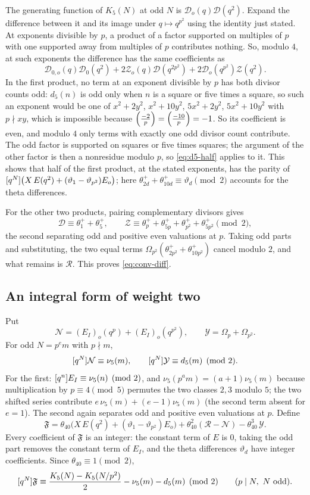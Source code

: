 The generating function of $K_5(N)$ at odd $N$ is $\mathcal D_o(q)\mathcal D(q^2)$.
Expand the difference between it and its image under $q\mapsto q^{p^2}$ using the
identity just stated. At exponents divisible by $p$, a product of a factor
supported on multiples of $p$ with one supported away from multiples of $p$
contributes nothing. So, modulo $4$, at such exponents the difference has the
same coefficients as
\[
  \mathcal D_{0,o}(q)\mathcal D_0(q^2)+2\mathcal Z_o(q)\mathcal D(q^{2p^2})+2\mathcal D_o(q^{p^2})\mathcal Z(q^2).
\]
In the first product, no term at an exponent divisible by $p$ has both divisor
counts odd: $d_5(n)$ is odd only when $n$ is a square or five times a square, so
such an exponent would be one of $x^2+2y^2$, $x^2+10y^2$, $5x^2+2y^2$,
$5x^2+10y^2$ with $p\nmid xy$, which is impossible because
$\Bigl(\frac{-2}{p}\Bigr)=\Bigl(\frac{-10}{p}\Bigr)=-1$. So its coefficient is even, and modulo $4$ only terms
with exactly one odd divisor count contribute. The odd factor is supported on
squares or five times squares; the argument of the other factor is then a
nonresidue modulo $p$, so \eqref{eq:d5-half} applies to it. This shows that half
of the first product, at the stated exponents, has the parity of
$[q^{N}]\bigl(X\,E(q^2)+(\vartheta_1-\vartheta_{p^2})E_o\bigr)$; here
$\theta^+_{2d}+\theta^+_{10d}\equiv\vartheta_d\pmod2$ accounts for the theta differences.

For the other two products, pairing complementary divisors gives
\[
  \mathcal D\equiv\theta^+_1+\theta^+_5,\qquad
  \mathcal Z\equiv\theta^+_p+\theta^+_{5p}+\theta^+_{p^2}+\theta^+_{5p^2}\pmod2 ,
\]
the second separating odd and positive even valuations at $p$. Taking odd parts
and substituting, the two equal terms $\Omega_{p^2}(\theta^+_{2p^2}+\theta^+_{10p^2})$
cancel modulo $2$, and what remains is $\mathcal R$. This proves \eqref{eq:conv-diff}.

\subsection{An integral form of weight two}
Put
\[
  \mathcal N=(E_I)_o(q^p)+(E_I)_o(q^{p^2}),\qquad \mathcal Y=\Omega_p+\Omega_{p^2}.
\]
For odd $N=p^em$ with $p\nmid m$,
\[
  [q^{N}]\mathcal N\equiv\nu_5(m),\qquad [q^{N}]\mathcal Y\equiv d_5(m)\pmod2 .
\]
For the first: $[q^{n}]E_I\equiv\nu_5(n)\pmod2$, and
$\nu_5(p^am)=(a+1)\nu_5(m)$ because multiplication by $p\equiv4\pmod5$ permutes the
two classes $2,3$ modulo $5$; the two shifted series contribute
$e\,\nu_5(m)+(e-1)\nu_5(m)$ (the second term absent for $e=1$). The second again
separates odd and positive even valuations at $p$. Define
\[
  \mathfrak F=\theta_{40}\bigl(X\,E(q^2)+(\vartheta_1-\vartheta_{p^2})E_o\bigr)
  +\theta_{40}^2(\mathcal R-\mathcal N)-\theta_{40}^3\,\mathcal Y .
\]
Every coefficient of $\mathfrak F$ is an integer: the constant term of $E$ is $0$,
taking the odd part removes the constant term of $E_I$, and the theta differences
$\vartheta_d$ have integer coefficients. Since $\theta_{40}\equiv1\pmod2$,
\begin{equation}\label{eq:F-coefficients}
  [q^{N}]\mathfrak F\equiv\frac{K_5(N)-K_5(N/p^2)}2-\nu_5(m)-d_5(m)\pmod2
  \qquad(p\mid N,\ N\ \mathrm{odd}).
\end{equation}

